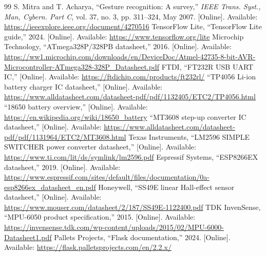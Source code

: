 \documentclass[conference]{IEEEtran}
\begin{document}
\begin{thebibliography}{99}
 S. Mitra and T. Acharya, ``Gesture recognition: A survey,'' \textit{IEEE Trans. Syst., Man, Cybern. Part C}, vol. 37, no. 3, pp. 311--324, May 2007. [Online]. Available: \url{https://ieeexplore.ieee.org/document/4270516}
 TensorFlow Lite, ``TensorFlow Lite guide,'' 2024. [Online]. Available: \url{https://www.tensorflow.org/lite}
 Microchip Technology, ``ATmega328P/328PB datasheet,'' 2016. [Online]. Available: \url{https://ww1.microchip.com/downloads/en/DeviceDoc/Atmel-42735-8-bit-AVR-Microcontroller-ATmega328-328P_Datasheet.pdf}
 FTDI, ``FT232R USB UART IC,'' [Online]. Available: \url{https://ftdichip.com/products/ft232rl/}
 ``TP4056 Li-ion battery charger IC datasheet,'' [Online]. Available: \url{https://www.alldatasheet.com/datasheet-pdf/pdf/1132405/ETC2/TP4056.html}
 ``18650 battery overview,'' [Online]. Available: \url{https://en.wikipedia.org/wiki/18650_battery}
 ``MT3608 step-up converter IC datasheet,'' [Online]. Available: \url{https://www.alldatasheet.com/datasheet-pdf/pdf/1131964/ETC2/MT3608.html}
 Texas Instruments, ``LM2596 SIMPLE SWITCHER power converter datasheet,'' [Online]. Available: \url{https://www.ti.com/lit/ds/symlink/lm2596.pdf}
 Espressif Systems, ``ESP8266EX datasheet,'' 2019. [Online]. Available: \url{https://www.espressif.com/sites/default/files/documentation/0a-esp8266ex_datasheet_en.pdf}
 Honeywell, ``SS49E linear Hall-effect sensor datasheet,'' [Online]. Available: \url{https://www.mouser.com/datasheet/2/187/SS49E-1122400.pdf}
 TDK InvenSense, ``MPU-6050 product specification,'' 2015. [Online]. Available: \url{https://invensense.tdk.com/wp-content/uploads/2015/02/MPU-6000-Datasheet1.pdf}
 Pallets Projects, ``Flask documentation,'' 2024. [Online]. Available: \url{https://flask.palletsprojects.com/en/2.2.x/}
\end{thebibliography}
\end{document}
